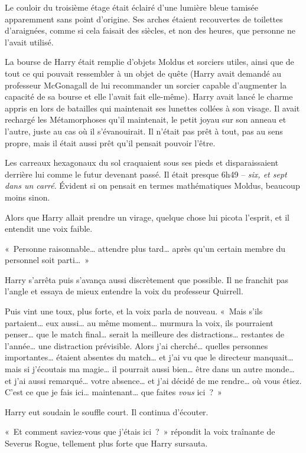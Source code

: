 Le couloir du troisième étage était éclairé d'une lumière bleue tamisée apparemment sans point d'origine.
Ses arches étaient recouvertes de toilettes d'araignées, comme si cela faisait des siècles, et non des heures, que personne ne l'avait utilisé.

La bourse de Harry était remplie d'objets Moldus et sorciers utiles, ainsi que de tout ce qui pouvait ressembler à un objet de quête (Harry avait demandé au professeur McGonagall de lui recommander un sorcier capable d'augmenter la capacité de sa bourse et elle l'avait fait elle-même).
Harry avait lancé le charme appris en lors de batailles qui maintenait ses lunettes collées à son visage.
Il avait rechargé les Métamorphoses qu'il maintenait, le petit joyau sur son anneau et l'autre, juste au cas où il s'évanouirait.
Il n'était pas prêt à tout, pas au sens propre, mais il était aussi prêt qu'il pensait pouvoir l'être.

Les carreaux hexagonaux du sol craquaient sous ses pieds et disparaissaient derrière lui comme le futur devenant passé.
Il était presque 6h49 -- \emph{six, et sept dans un carré}.
Évident si on pensait en termes mathématiques Moldus, beaucoup moins sinon.

Alors que Harry allait prendre un virage, quelque chose lui picota l'esprit, et il entendit une voix faible.

«~Personne raisonnable… attendre plus tard… après qu'un certain membre du personnel soit parti…~»

Harry s'arrêta puis s'avança aussi discrètement que possible.
Il ne franchit pas l'angle et essaya de mieux entendre la voix du professeur Quirrell.

Puis vint une toux, plus forte, et la voix parla de nouveau.
«~Mais s'ils partaient… eux aussi… au même moment… murmura la voix, ils pourraient penser… que le match final… serait la meilleure des distractions… restantes de l'année… une distraction prévisible.
Alors j'ai cherché… quelles personnes importantes… étaient absentes du match… et j'ai vu que le directeur manquait… mais si j'écoutais ma magie… il pourrait aussi bien… être dans un autre monde… et j'ai aussi remarqué… votre absence… et j'ai décidé de me rendre… où vous étiez.
C'est ce que je fais ici… maintenant… que faites \emph{vous} ici~?~»

Harry eut soudain le souffle court.
Il continua d'écouter.

«~Et comment saviez-vous que j'étais ici~?~»
répondit la voix traînante de Severus Rogue, tellement plus forte que Harry sursauta.

